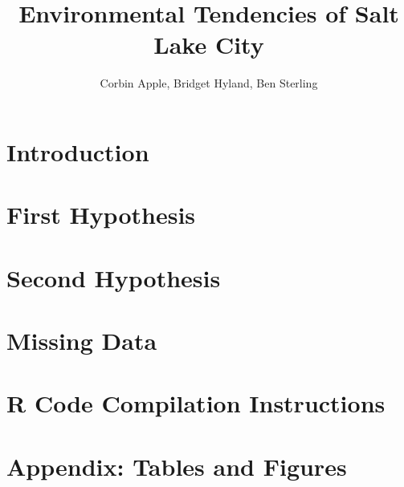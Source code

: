 \documentclass[final]{siamart1116}
\title{Environmental Tendencies of Salt Lake City}
\author{Corbin Apple, Bridget Hyland, Ben Sterling}
\begin{document}
\maketitle

\section{Introduction}


\section{First Hypothesis}


\section{Second Hypothesis}


\section{Missing Data}


\section{R Code Compilation Instructions}





\section{Appendix: Tables and Figures}
\newpage


\end{document}
